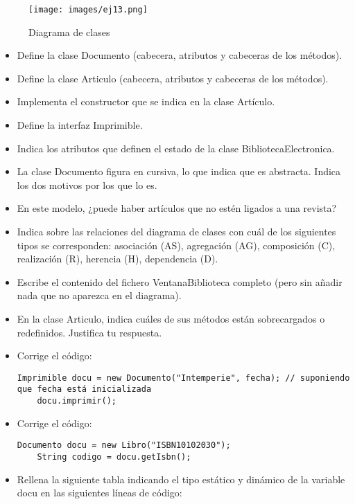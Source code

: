 \documentclass[a4paper,12pt]{article}
\begin{document}
\begin{figure}[H]
    \centering
    \texttt{[image: images/ej13.png]}
    \caption{Diagrama de clases}
    \label{fig:ejercicio13}
\end{figure}



\begin{itemize}
    \item Define la clase Documento (cabecera, atributos y cabeceras de los métodos).
    \item Define la clase Articulo (cabecera, atributos y cabeceras de los métodos).
    \item Implementa el constructor que se indica en la clase Artículo.
    \item Define la interfaz Imprimible.
    \item Indica los atributos que definen el estado de la clase BibliotecaElectronica.
    \item La clase Documento figura en cursiva, lo que indica que es abstracta. Indica los dos motivos por los que lo es.
    \item En este modelo, ¿puede haber artículos que no estén ligados a una revista?
    \item Indica sobre las relaciones del diagrama de clases con cuál de los siguientes tipos se corresponden: asociación (AS), agregación (AG), composición (C), realización (R), herencia (H), dependencia (D).
    \item Escribe el contenido del fichero VentanaBiblioteca completo (pero sin añadir nada que no aparezca en el diagrama).
    \item En la clase Articulo, indica cuáles de sus métodos están sobrecargados o redefinidos. Justifica tu respuesta.
    \item Corrige el código:
    \begin{lstlisting}[style=customjava]
    Imprimible docu = new Documento("Intemperie", fecha); // suponiendo que fecha está inicializada
    docu.imprimir();
    \end{lstlisting}
    \item Corrige el código:
    \begin{lstlisting}[style=customjava]
    Documento docu = new Libro("ISBN10102030");
    String codigo = docu.getIsbn();
    \end{lstlisting}
    \item Rellena la siguiente tabla indicando el tipo estático y dinámico de la variable docu en las siguientes líneas de código:

\end{itemize}
\end{document}
